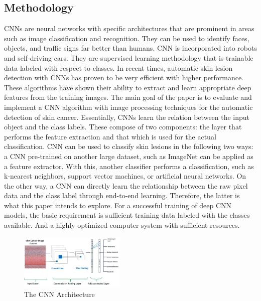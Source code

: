 \documentclass[twocolumn]{article}
\begin{document}
\subsection{Methodology}
CNNs are neural networks with specific architectures that are prominent in areas such as image classification and recognition. They can be used to identify faces, objects, and traffic signs far better than humans. CNN is incorporated into robots and self-driving cars. They are supervised learning methodology that is trainable data labeled with respect to classes. 
In recent times, automatic skin lesion detection with CNNs has proven to be very efficient with higher performance. These algorithms have shown their ability to extract and learn appropriate deep features from the training images. The main goal of the paper is to evaluate and implement a CNN algorithm with image processing techniques for the automatic detection of skin cancer.
Essentially, CNNs learn the relation between the input object and the class labels. These compose of two components: the layer that performs the feature extraction and that which is used for the actual classification. 
CNN can be used to classify skin lesions in the following two ways: a CNN pre-trained on another large dataset, such as ImageNet can be applied as a feature extractor. With this, another classifier performs a classification, such as k-nearest neighbors, support vector machines, or artificial neural networks.  On the other way, a CNN can directly learn the relationship between the raw pixel data and the class label through end-to-end learning. Therefore, the latter is what this paper intends to explore. For a successful training of deep CNN models, the basic requirement is sufficient training data labeled with the classes available. And a highly optimized computer system with sufficient resources.

\begin{figure}[H]
  \centering
  \includegraphics[width=0.45\textwidth]{modelArchetect.jpg}
  \caption{The CNN Architecture}
  \label{fig:image}
\end{figure}
\end{document}
